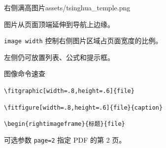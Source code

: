 \begin{rightimageframe}[image width=.40]{右侧满高图片}{assets/tsinghua_temple.png}
      \begin{description}[高度]
            \item[高度] 图片从页面顶端延伸到导航上边缘。
            \item[宽度] \texttt{image width} 控制右侧图片区域占页面宽度的比例。
            \item[正文] 左侧仍可放置列表、公式和提示框。
      \end{description}
\end{rightimageframe}

\begin{frame}[fragile]{图像命令速查}
      \begin{description}[适配素材]
            \item[适配素材] \verb|\fitgraphic[width=.8,height=.6]{file}|
            \item[添加图注] \verb|\fitfigure[width=.8,height=.6]{file}{caption}|
            \item[右侧图片] \verb|\begin{rightimageframe}{标题}{file}|
            \item[PDF 页面] 可选参数 \texttt{page=2} 指定 PDF 的第 2 页。
      \end{description}
\end{frame}
